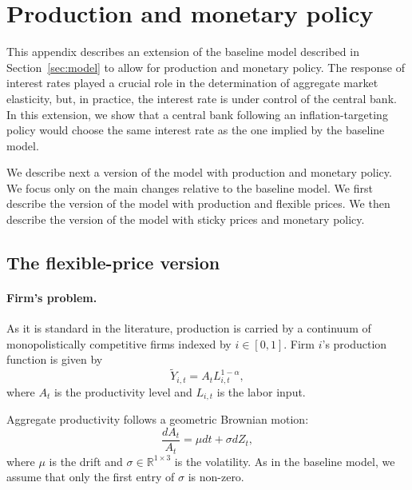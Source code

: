 
\section{Production and monetary policy}\label{sec:production_and_monetary_policy}

This appendix describes an extension of the baseline model described in Section~\ref{sec:model} to allow for production and monetary policy.
The response of interest rates played a crucial role in the determination of aggregate market elasticity, but, in practice, the interest rate is under control of the central bank. 
In this extension, we show that a central bank following an inflation-targeting policy would choose the same interest rate as the one implied by the baseline model.

We describe next a version of the model with production and monetary policy. 
We focus only on the main changes relative to the baseline model. 
We first describe the version of the model with production and flexible prices. 
We then describe the version of the model with sticky prices and monetary policy.

\subsection{The flexible-price version}

\paragraph{Firm's problem.} As it is standard in the literature, production is carried by a continuum of monopolistically competitive firms indexed by $i \in [0,1]$.
Firm $i$'s production function is given by
\begin{equation}\label{eq:production_function}
    \tilde{Y}_{i,t} = A_t L_{i,t}^{1-\alpha},
\end{equation}
where $A_t$ is the productivity level and $L_{i,t}$ is the labor input.

Aggregate productivity follows a geometric Brownian motion:
\begin{equation}
    \frac{dA_t}{A_t} = \mu dt + \sigma dZ_t,
\end{equation}
where $\mu$ is the drift and $\sigma \in \mathbb{R}^{1\times 3}$ is the volatility. 
As in the baseline model, we assume that only the first entry of $\sigma$ is non-zero.

